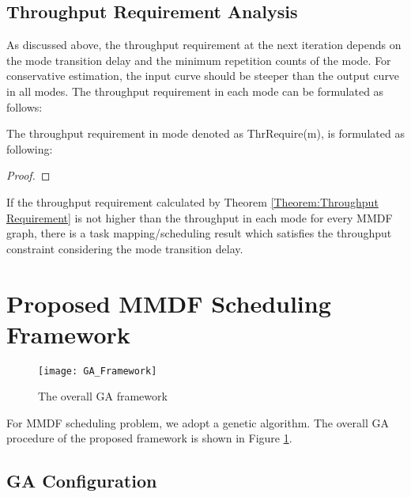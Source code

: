 \documentclass[prodmode,acmtecs]{acmsmall}
\begin{document}
\subsection{Throughput Requirement Analysis}
\label{SubSection:Throughput Requirement Analysis}

As discussed above, the throughput requirement at the next iteration depends on the mode transition delay and the minimum repetition counts of the mode. For conservative estimation, the input curve should be steeper than the output curve in all modes. The throughput requirement in each mode can be formulated as follows:

\begin{theorem}  The throughput requirement in mode 
denoted as ThrRequire(m), is formulated as following:

\label{Theorem:Throughput Requirement}

\end{theorem}

\begin{proof}

\end{proof}

If the throughput requirement calculated by Theorem \ref{Theorem:Throughput Requirement} is not higher than the throughput in each mode for every MMDF graph, there is a task mapping/scheduling result which satisfies the throughput constraint considering the mode transition delay.


\section{Proposed MMDF Scheduling Framework}
\label{Section:Proposed MMDF Scheduling Framework}

\begin{figure} [ht]
\centerline{\texttt{[image: GA\_Framework]}}
\caption{The overall GA framework}
\label{Figure:GA Framework}
\end{figure}

For MMDF scheduling problem, we adopt a genetic algorithm. The overall GA procedure of the proposed framework is shown in Figure \ref{Figure:GA Framework}.

\subsection{GA Configuration}
\label{SubSection:GA Configuration}
\end{document}
